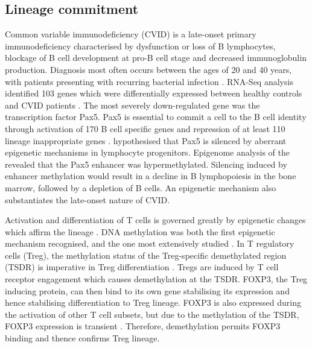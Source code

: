 \documentclass[12pt]{article}
\begin{document}
		\subsection{Lineage commitment}
			Common variable immunodeficiency (CVID) is a late-onset primary immunodeficiency characterised by dysfunction or loss of B lymphocytes, blockage of B cell development at pro-B cell stage and decreased immunoglobulin production. 
			Diagnosis most often occurs between the ages of 20 and 40 years, with patients presenting with recurring bacterial infection \citep{Cunningham-Rundles12}.
			RNA-Seq analysis identified 103 genes which were differentially expressed between healthy controls and CVID patients \citep{Tallmadge15}.
			The most severely down-regulated gene was the transcription factor Pax5.
			Pax5 is essential to commit a cell to the B cell identity through activation of 170 B cell specific genes and repression of at least 110 lineage inappropriate genes \citep{Schebesta07,Delogu06,Roessler07}.
			\citet{Tallmadge15} hypothesised that Pax5 is silenced by aberrant epigenetic mechanisms in lymphocyte progenitors. 
			Epigenome analysis of the revealed that the Pax5 enhancer was hypermethylated.
			Silencing induced by enhancer methylation would result in a decline in B lymphopoiesis in the bone marrow, followed by a depletion of B cells.
			An epigenetic mechanism also substantiates the late-onset nature of CVID. 
			
			
			
			Activation and differentiation of T cells is governed greatly by epigenetic changes which affirm the lineage \citep{Zeng13}.
			DNA methylation was both the first epigenetic mechanism recognised, and the one most extensively studied \citep{Begin14}. 
			In T regulatory cells (Treg), the methylation status of the Treg-specific demethylated region (TSDR) is imperative in Treg differentiation \citep{Polansky08}.
			Tregs are induced by T cell receptor engagement which causes demethylation at the TSDR.
			FOXP3, the Treg inducing protein, can then bind to its own gene stabilising its expression and hence stabilising differentiation to Treg lineage.
			FOXP3 is also expressed during the activation of other T cell subsets, but due to the methylation of the TSDR, FOXP3 expression is transient \citep{Ohkura13}.
			Therefore, demethylation permits FOXP3 binding and thence confirms Treg lineage.
	
\end{document}
